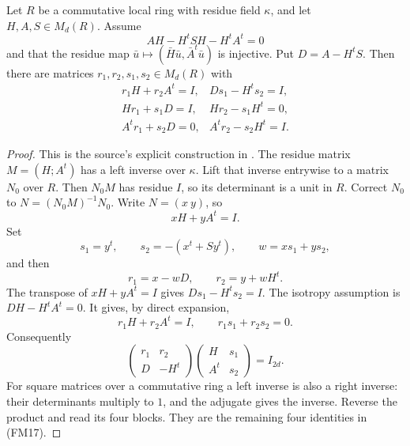 \begin{srlemma}\label{lem:faithful-local-matrix-splitting}
Let \(R\) be a commutative local ring with residue field
\(\kappa\), and let \(H,A,S\in M_d(R)\).
Assume
\[
             AH-H^tSH-H^tA^t=0
\]
and that the residue map
\(\bar u\mapsto(\bar H\bar u,\bar A^t\bar u)\)
is injective.
Put \(D=A-H^tS\).
Then there are matrices \(r_1,r_2,s_1,s_2\in M_d(R)\)
with
\[
 \begin{array}{ll}
 r_1H+r_2A^t=I,&Ds_1-H^ts_2=I,\\
 Hr_1+s_1D=I,&Hr_2-s_1H^t=0,\\
 A^tr_1+s_2D=0,&A^tr_2-s_2H^t=I .
 \end{array}
 \tag{FM17}\label{eq:faithful-six-splitting-equations}
\]
\end{srlemma}
\begin{proof}
This is the source's explicit construction in
.
The residue matrix \(M=(H;A^t)\) has a left inverse
over \(\kappa\).
Lift that inverse entrywise to a matrix \(N_0\) over \(R\).
Then \(N_0M\) has residue \(I\), so its determinant is
a unit in \(R\).
Correct \(N_0\) to
\(N=(N_0M)^{-1}N_0\).
Write \(N=(x\ y)\), so
\[
                         xH+yA^t=I.
\]
Set
\[
       s_1=y^t,\qquad s_2=-(x^t+Sy^t),\qquad
       w=xs_1+ys_2,
\]
and then
\[
                         r_1=x-wD,\qquad r_2=y+wH^t.
\]
The transpose of \(xH+yA^t=I\) gives
\(Ds_1-H^ts_2=I\).
The isotropy assumption is \(DH-H^tA^t=0\).
It gives, by direct expansion,
\[
              r_1H+r_2A^t=I,\qquad r_1s_1+r_2s_2=0.
\]
Consequently
\[
 \begin{pmatrix}r_1&r_2\\D&-H^t\end{pmatrix}
 \begin{pmatrix}H&s_1\\A^t&s_2\end{pmatrix}=I_{2d}.
\]
For square matrices over a commutative ring a left
inverse is also a right inverse: their determinants
multiply to \(1\), and the adjugate gives the inverse.
Reverse the product and read its four blocks.
They are the remaining four identities in (FM17).
\end{proof}

